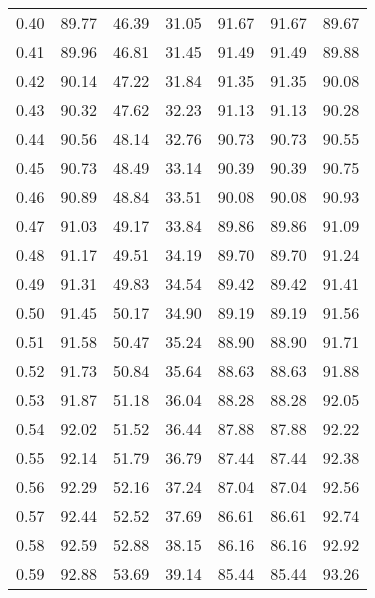 \begin{tabular}{|c|c|c|c|c|c|c|}
      0.40 &     89.77 &     46.39 &      31.05 &   91.67 &      91.67 &         89.67 \\
      0.41 &     89.96 &     46.81 &      31.45 &   91.49 &      91.49 &         89.88 \\
      0.42 &     90.14 &     47.22 &      31.84 &   91.35 &      91.35 &         90.08 \\
      0.43 &     90.32 &     47.62 &      32.23 &   91.13 &      91.13 &         90.28 \\
      0.44 &     90.56 &     48.14 &      32.76 &   90.73 &      90.73 &         90.55 \\
      0.45 &     90.73 &     48.49 &      33.14 &   90.39 &      90.39 &         90.75 \\
      0.46 &     90.89 &     48.84 &      33.51 &   90.08 &      90.08 &         90.93 \\
      0.47 &     91.03 &     49.17 &      33.84 &   89.86 &      89.86 &         91.09 \\
      0.48 &     91.17 &     49.51 &      34.19 &   89.70 &      89.70 &         91.24 \\
      0.49 &     91.31 &     49.83 &      34.54 &   89.42 &      89.42 &         91.41 \\
      0.50 &     91.45 &     50.17 &      34.90 &   89.19 &      89.19 &         91.56 \\
      0.51 &     91.58 &     50.47 &      35.24 &   88.90 &      88.90 &         91.71 \\
      0.52 &     91.73 &     50.84 &      35.64 &   88.63 &      88.63 &         91.88 \\
      0.53 &     91.87 &     51.18 &      36.04 &   88.28 &      88.28 &         92.05 \\
      0.54 &     92.02 &     51.52 &      36.44 &   87.88 &      87.88 &         92.22 \\
      0.55 &     92.14 &     51.79 &      36.79 &   87.44 &      87.44 &         92.38 \\
      0.56 &     92.29 &     52.16 &      37.24 &   87.04 &      87.04 &         92.56 \\
      0.57 &     92.44 &     52.52 &      37.69 &   86.61 &      86.61 &         92.74 \\
      0.58 &     92.59 &     52.88 &      38.15 &   86.16 &      86.16 &         92.92 \\
      0.59 &     92.88 &     53.69 &      39.14 &   85.44 &      85.44 &         93.26 \\

\end{tabular}
